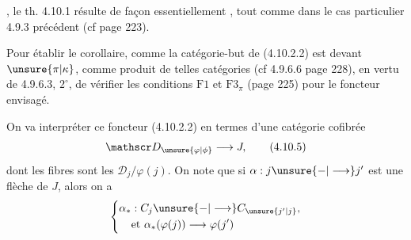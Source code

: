 , le th. 4.10.1 résulte de façon essentiellement , tout comme dans le cas particulier 4.9.3 précédent (cf page 223). 

Pour établir le corollaire, comme la catégorie-but de (4.10.2.2) est  devant $\unsure{\pi|\kappa}$, comme produit de telles catégories (cf 4.9.6.6 page 228),   en vertu de 4.9.6.3, $2^\circ$, de vérifier les conditions $\mathrm F1$ et $\mathrm F3_{\pi}$  (page 225) pour le foncteur envisagé.

On va interpréter ce foncteur (4.10.2.2) en termes d'une catégorie cofibrée
\[
 \mathscr D_{\unsure{\varphi|\phi}}\longrightarrow J, \tag*{(4.10.5)}
\]
dont les fibres sont les $\mathscr D_j/\varphi(j)$.
On note que si $\alpha:j\unsure{\mathbin{-}|\longrightarrow}j'$ est une flèche de $J$, alors on a
\[
 \left\{\begin{aligned}
 \alpha_* &: C_j\unsure{\mathbin{-}|\longrightarrow} C_{\unsure{j'|j}},\\
 &\text{et }\alpha_*(\varphi(j))\longrightarrow\varphi(j')
 \end{aligned}\right.
\]
